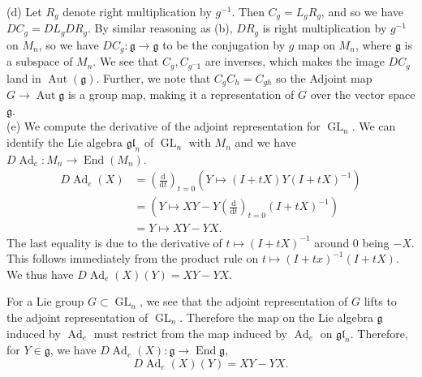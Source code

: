\documentclass{amsart}
\numberwithin{equation}{section}
\theoremstyle{plain}
\theoremstyle{definition}
\theoremstyle{remark}
\newcommand{\Aut}{\operatorname{Aut}}
\newcommand{\g}{\mathfrak{g}}
\newcommand{\gl}{\mathfrak{gl}}
\renewcommand{\_}[2]{\underbrace{#1}_{#2}}
\renewcommand{\^}[2]{\overbrace{#1}_{#2}}
\newcommand{\Ad}{\operatorname{Ad}}
\newcommand{\End}{\operatorname{End}}
\newcommand{\GL}{\operatorname{GL}}
\renewcommand{\d}{\mathrm{d}}
\renewcommand{\Ad}{\operatorname{Ad}}
\begin{document}
(d) Let $R_g$ denote right multiplication by $g^{-1}$. Then $C_g = L_gR_g$, and so we have $DC_g = DL_g DR_g$. By similar reasoning as (b), $DR_g$ is right multiplication by $g^{-1}$ on $M_n$, so we have $DC_g: \g \to \g$ to be the conjugation by $g$ map on $M_n$, where $\g$ is a subspace of $M_n$. We see that $C_g, C_{g^-1}$ are inverses, which makes the image $DC_g$ land in $\Aut(\g)$. Further, we note that $C_gC_h = C_{gh}$ so the Adjoint map $G \to \Aut \g$ is a group map, making it a representation of $G$ over the vector space $\g$.\\

(e) We compute the derivative of the adjoint representation for $\GL_n$. We can identify the Lie algebra $\gl_n$ of $\GL_n$ with $M_n$ and we have $D\Ad_e: M_n \to \End(M_n)$. 
\begin{align*}
  D\Ad_e(X) &= \left(\frac{\d }{\d t}\right)_{t=0} \left (Y \mapsto (I+tX) Y(I+tX)^{-1}\right ) \\
            &= \left(Y \mapsto XY - Y\left(\frac{\d }{\d t}\right)_{t=0}(I+tX)^{-1}\right) \\
            &= Y \mapsto XY - YX.
\end{align*}
The last equality is due to the derivative of $t\mapsto (I+tX)^{-1}$ around $0$ being $-X$. This follows immediately from the product rule on $t\mapsto (I+tx)^{-1}(I+tX)$. We thus have $D\Ad_e(X)(Y) = XY - YX$.

For a Lie group $G \subset \GL_n$, we see that the adjoint representation of $G$ lifts to the adjoint representation of $\GL_n$. Therefore the map on the Lie algebra $\g$ induced by $\Ad_e$ must restrict from the map induced by $\Ad_e$ on $\gl_n$. Therefore, for $Y \in \g$, we have $D\Ad_e(X):\g \to \End \g$, $$D\Ad_e(X)(Y) = XY - YX.$$
\end{document}
